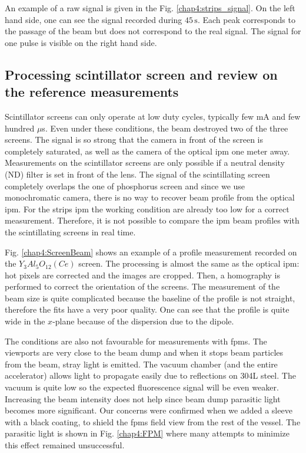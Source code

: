 \begin{refsection}
  An example of a raw signal is given in the Fig. \ref{chap4:strips_signal}. On the left hand side, one can see the signal recorded during $45\,\mathrm{s}$. Each peak corresponds to the passage of the beam but does not correspond to the real signal. The signal for one pulse is visible on the right hand side.

  

  \subsection{Processing scintillator screen and review on the reference measurements}

  Scintillator screens can only operate at low duty cycles, typically few mA and few hundred $\mu$s. Even under these conditions, the beam destroyed two of the three screens. The signal is so strong that the camera in front of the screen is completely saturated, as well as the camera of the optical \acrshort{ipm} one meter away. Measurements on the scintillator screens are only possible if a neutral density (ND) filter is set in front of the lens. The signal of the scintillating screen completely overlaps the one of phosphorus screen and since we use monochromatic camera, there is no way to recover beam profile from the optical \acrshort{ipm}. For the strips \acrshort{ipm} the working condition are already too low for a correct measurement. Therefore, it is not possible to compare the \acrshort{ipm} beam profiles with the scintillating screens in real time.
  

  Fig. \ref{chap4:ScreenBeam} shows an example of a profile measurement recorded on the $Y_{3}Al_{5}O_{12}(Ce)$ screen. The processing is almost the same as the optical \acrshort{ipm}: hot pixels are corrected and the images are cropped. Then, a homography \cite{szeliski2010,opencv_library} is performed to correct the orientation of the screens. The measurement of the beam size is quite complicated because the baseline of the profile is not straight, therefore the fits have a very poor quality. One can see that the profile is quite wide in the $x$-plane because of the dispersion due to the dipole.

  The conditions are also not favourable for measurements with \acrshort{fpm}s. The viewports are very close to the beam dump and when it stops beam particles from the beam, stray light is emitted. The vacuum chamber (and the entire accelerator) allows light to propagate easily due to reflections on 304L steel. The vacuum is quite low so the expected fluorescence signal will be even weaker. Increasing the beam intensity does not help since beam dump parasitic light becomes more significant.
  Our concerns were confirmed when we added a sleeve with a black coating, to shield the \acrshort{fpm}s field view from the rest of the vessel. The parasitic light is shown in Fig. \ref{chap4:FPM} where many attempts to minimize this effect remained unsuccessful.


\end{refsection}
